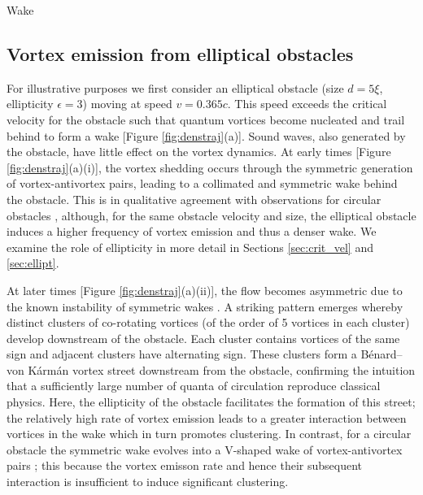 \begin{chapter}{\label{cha:wake}Wake}
\subsection{Vortex emission from elliptical obstacles}


For illustrative purposes we first consider an elliptical obstacle (size $d=5\xi$, ellipticity $\epsilon=3$) moving at speed $v=0.365c$.  This speed exceeds the critical velocity for the obstacle such that quantum vortices become nucleated and trail behind to form a wake [Figure \ref{fig:denstraj}(a)].  Sound waves, also generated by the obstacle, have little effect on the vortex dynamics. At early times [Figure \ref{fig:denstraj}(a)(i)], the vortex shedding occurs through the symmetric generation of vortex-antivortex pairs, leading to a collimated and symmetric wake behind the obstacle.  This is in qualitative agreement with observations for circular obstacles  \cite{frisch92,nore93,win00,huepe00}, although, for the same obstacle velocity and size, the elliptical obstacle induces a higher frequency of vortex emission and thus a denser wake.  We examine the role of ellipticity in more detail in Sections \ref{sec:crit_vel} and \ref{sec:ellipt}.  

At later times [Figure \ref{fig:denstraj}(a)(ii)], the flow becomes asymmetric due to the known instability of symmetric wakes \cite{nore93}.  A striking pattern emerges whereby distinct clusters of co-rotating vortices (of the order of 5 vortices in each cluster) develop downstream of the obstacle.  Each cluster contains vortices of the same sign and adjacent clusters have alternating sign.  These clusters form a B\'enard--von K\'arm\'an vortex street downstream from the obstacle, confirming the intuition that a sufficiently large number of quanta of circulation reproduce classical physics.  Here, the ellipticity of the obstacle facilitates the formation of this street; the relatively high rate of vortex emission leads to a greater interaction between vortices in the wake which in turn promotes clustering.  In contrast, for a circular obstacle the symmetric wake evolves into a V-shaped wake of vortex-antivortex pairs \cite{saito10}; this because the vortex emisson rate and hence their subsequent interaction is insufficient to induce significant clustering.  



\end{chapter}
